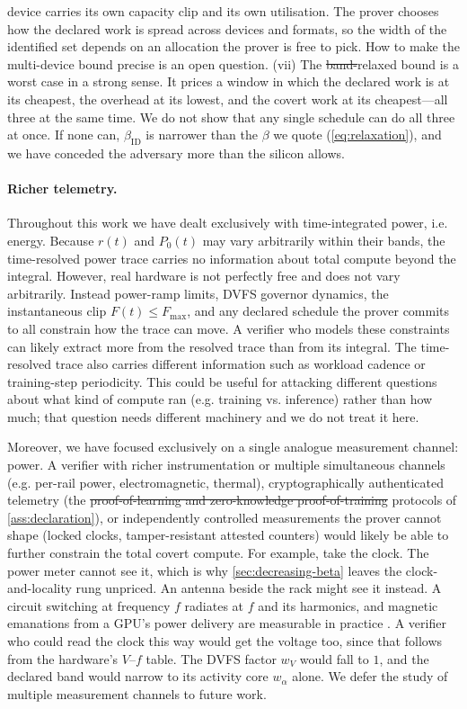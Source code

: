 \documentclass{article}
\makeatletter
\theoremstyle{plain}
\theoremstyle{definition}
\theoremstyle{remark}
\providecommand{\DIFdeltex}[1]{{\protect\color{red}\sout{#1}}} %
\providecommand{\DIFdelbegin}{} %
\providecommand{\DIFdelend}{} %
\providecommand{\DIFdel}[1]{\texorpdfstring{\DIFdeltex{#1}}{}} %
\providecommand{\DIFscaledelfig}{0.5}
\newlength{\DIFdelgraphicswidth} %
\newlength{\DIFdelgraphicsheight} %
\providecommand{\DIFdelincludegraphics}[2][]{%
\sbox{\DIFdelgraphicsbox}{\DIFOincludegraphics[#1]{#2}}%
\settoboxwidth{\DIFdelgraphicswidth}{\DIFdelgraphicsbox} %
\settoboxtotalheight{\DIFdelgraphicsheight}{\DIFdelgraphicsbox} %
\scalebox{\DIFscaledelfig}{%
\parbox[b]{\DIFdelgraphicswidth}{\usebox{\DIFdelgraphicsbox}\\[-\baselineskip] \rule{\DIFdelgraphicswidth}{0em}}\llap{\resizebox{\DIFdelgraphicswidth}{\DIFdelgraphicsheight}{%
\setlength{\unitlength}{\DIFdelgraphicswidth}%
\begin{picture}(1,1)%
\thicklines\linethickness{2pt} %
{\color[rgb]{1,0,0}\put(0,0){\framebox(1,1){}}}%
{\color[rgb]{1,0,0}\put(0,0){\line( 1,1){1}}}%
{\color[rgb]{1,0,0}\put(0,1){\line(1,-1){1}}}%
\end{picture}%
}\hspace*{3pt}}} %
} %
\DeclareRobustCommand{\DIFdelbegin}{\DIFOdelbegin \let\includegraphics\DIFdelincludegraphics} %
\DeclareRobustCommand{\DIFdelend}{\DIFOaddend \let\includegraphics\DIFOincludegraphics} %
\let\sout@orig\sout %
\renewcommand{\sout}[1]{\ifmmode\text{\sout@orig{\ensuremath{#1}}}\else\sout@orig{#1}\fi} %
\makeatother
\begin{document}
device carries its own capacity clip and its own utilisation. The
prover chooses how the declared work is spread across devices and formats, so
the width of the identified set depends on an allocation the prover is free to
pick. How to make the multi-device bound precise is an open question.
(vii) The \DIFdelbegin \DIFdel{band-}\DIFdelend relaxed bound is a worst case in a strong sense. It
prices a window in which the declared work is at its cheapest, the overhead at
its lowest, and the covert work at its cheapest---all three at the same time.
We do not show that any single schedule can do all three at once. If none can,
$\beta_{\mathrm{ID}}$ is narrower than the $\beta$ we quote
(\cref{eq:relaxation}), and we have conceded the adversary
more than the silicon allows.

\paragraph{Richer telemetry.}
Throughout this work we have dealt exclusively with time-integrated power, i.e. energy. Because $r(t)$ and $P_0(t)$ may vary arbitrarily within their
bands, the time-resolved power trace carries no information about total compute beyond the integral. However, real hardware is not perfectly free and does not vary arbitrarily. Instead power-ramp limits, DVFS
governor dynamics, the instantaneous clip $F(t) \le F_{\max}$, and any
declared schedule the prover commits to all constrain how the trace
can move. A verifier who models these constraints can likely extract more from the
resolved trace than from its integral. The time-resolved trace also carries different information such as workload cadence or 
training-step periodicity. This could be useful for attacking different questions about what kind of compute
ran (e.g. training vs. inference) rather than how much; that question needs different machinery and we
do not treat it here.

Moreover, we have focused exclusively on a single analogue measurement channel: power. A verifier with richer
instrumentation or multiple simultaneous channels
(e.g. per-rail power, electromagnetic, thermal), cryptographically
authenticated telemetry (the \DIFdelbegin \DIFdel{proof-of-learning and zero-knowledge
proof-of-training }\DIFdelend protocols of \cref{ass:declaration}), or independently
controlled measurements the prover cannot shape (locked clocks,
tamper-resistant attested counters) would likely be able to further constrain the total covert compute. For example, take the clock. The power meter cannot see it, which is why
\cref{sec:decreasing-beta} leaves the clock-and-locality rung unpriced. An
antenna beside the rack might see it instead. A circuit switching at frequency
$f$ radiates at $f$ and its harmonics, and magnetic emanations from a GPU's
power delivery are measurable in practice \citep{maia2022magnetic}. A verifier
who could read the clock this way would get the voltage too, since that follows
from the hardware's $V$--$f$ table. The DVFS factor $w_V$ would fall to $1$, and
the declared band would narrow to its activity core $w_\alpha$ alone. We defer the study of multiple measurement channels to future work. 
\end{document}
